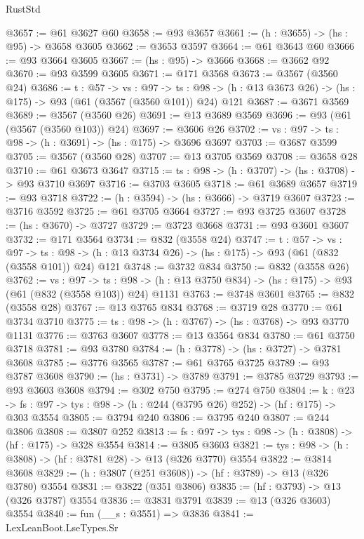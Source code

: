 \begin{lexlean}{RustStd}
\begin{coremodule}
@3657 := @61 @3627 @60
@3658 := @93 @3657
@3661 := (h : @3655) -> (hs : @95) -> @3658 @3605
@3662 := @3653 @3597
@3664 := @61 @3643 @60
@3666 := @93 @3664 @3605
@3667 := (hs : @95) -> @3666
@3668 := @3662 @92
@3670 := @93 @3599 @3605
@3671 := @171 @3568
@3673 := @3567 (@3560 @24)
@3686 := {t : @57} ->
  {vs : @97} ->
  {ts : @98} -> (h : @13 @3673 @26) -> (hs : @175) -> @93 (@61 (@3567 (@3560 @101)) @24) @121
@3687 := @3671 @3569
@3689 := @3567 (@3560 @26)
@3691 := @13 @3689 @3569
@3696 := @93 (@61 (@3567 (@3560 @103)) @24)
@3697 := @3606 @26
@3702 := {vs : @97} -> {ts : @98} -> (h : @3691) -> (hs : @175) -> @3696 @3697
@3703 := @3687 @3599
@3705 := @3567 (@3560 @28)
@3707 := @13 @3705 @3569
@3708 := @3658 @28
@3710 := @61 @3673 @3647
@3715 := {ts : @98} -> (h : @3707) -> (hs : @3708) -> @93 @3710 @3697
@3716 := @3703 @3605
@3718 := @61 @3689 @3657
@3719 := @93 @3718
@3722 := (h : @3594) -> (hs : @3666) -> @3719 @3607
@3723 := @3716 @3592
@3725 := @61 @3705 @3664
@3727 := @93 @3725 @3607
@3728 := (hs : @3670) -> @3727
@3729 := @3723 @3668
@3731 := @93 @3601 @3607
@3732 := @171 @3564
@3734 := @832 (@3558 @24)
@3747 := {t : @57} ->
  {vs : @97} ->
  {ts : @98} -> (h : @13 @3734 @26) -> (hs : @175) -> @93 (@61 (@832 (@3558 @101)) @24) @121
@3748 := @3732 @834
@3750 := @832 (@3558 @26)
@3762 := {vs : @97} ->
  {ts : @98} -> (h : @13 @3750 @834) -> (hs : @175) -> @93 (@61 (@832 (@3558 @103)) @24) @1131
@3763 := @3748 @3601
@3765 := @832 (@3558 @28)
@3767 := @13 @3765 @834
@3768 := @3719 @28
@3770 := @61 @3734 @3710
@3775 := {ts : @98} -> (h : @3767) -> (hs : @3768) -> @93 @3770 @1131
@3776 := @3763 @3607
@3778 := @13 @3564 @834
@3780 := @61 @3750 @3718
@3781 := @93 @3780
@3784 := (h : @3778) -> (hs : @3727) -> @3781 @3608
@3785 := @3776 @3565
@3787 := @61 @3765 @3725
@3789 := @93 @3787 @3608
@3790 := (hs : @3731) -> @3789
@3791 := @3785 @3729
@3793 := @93 @3603 @3608
@3794 := @302 @750
@3795 := @274 @750
@3804 := {k : @23} ->
  {fs : @97} -> {tys : @98} -> (h : @244 (@3795 @26) @252) -> (hf : @175) -> @303 @3554
@3805 := @3794 @240
@3806 := @3795 @240
@3807 := @244 @3806
@3808 := @3807 @252
@3813 := {fs : @97} -> {tys : @98} -> (h : @3808) -> (hf : @175) -> @328 @3554
@3814 := @3805 @3603
@3821 := {tys : @98} -> (h : @3808) -> (hf : @3781 @28) -> @13 (@326 @3770) @3554
@3822 := @3814 @3608
@3829 := (h : @3807 (@251 @3608)) -> (hf : @3789) -> @13 (@326 @3780) @3554
@3831 := @3822 (@351 @3806)
@3835 := (hf : @3793) -> @13 (@326 @3787) @3554
@3836 := @3831 @3791
@3839 := @13 (@326 @3603) @3554
@3840 := fun (__s : @3551) => @3836
@3841 := LexLeanBoot.LseTypes.Sr

\end{coremodule}
\end{lexlean}
